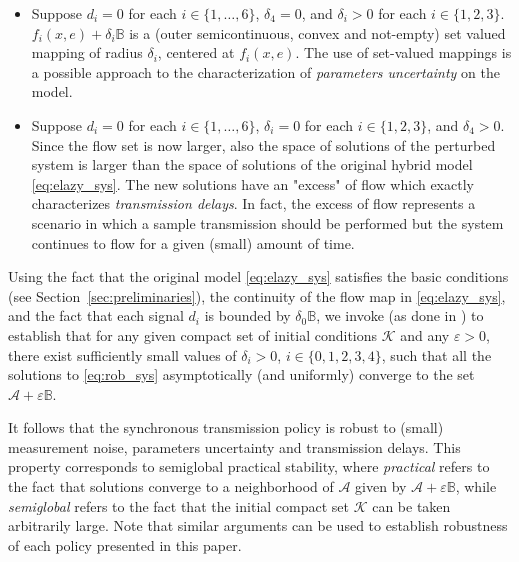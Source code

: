 \documentclass[twocolumn]{autart}
\begin{document}
{\begin{itemize}
\item Suppose $d_i=0$ for each $i\in\{1,\dots,6\}$, $\delta_4=0$,
and $\delta_i>0$ for each $i\in\{1,2,3\}$. 
$f_i(x,e) + \delta_i \mathbb{B}$ is a (outer semicontinuous, convex and not-empty)
set valued mapping of radius $\delta_i$, centered at $f_i(x,e)$. 
The use of set-valued mappings is a possible approach to the characterization
of \emph{parameters uncertainty} on the model.

\item Suppose $d_i=0$ for each $i\in\{1,\dots,6\}$, 
$\delta_i=0$ for each $i\in\{1,2,3\}$, and $\delta_4>0$.
Since the flow set is now larger, also the space of solutions
of the perturbed system is larger than the
space of solutions of the original hybrid model \eqref{eq:elazy_sys}.
The new solutions have an "excess" of flow which exactly characterizes
\emph{transmission delays}. In fact, the excess of flow represents a 
scenario in which a sample transmission should be performed but the
system continues to flow for a given (small) amount of time.
\end{itemize}

Using the fact that the original model \eqref{eq:elazy_sys} satisfies
the basic conditions (see Section~\ref{sec:preliminaries}), the continuity of the flow map in \eqref{eq:elazy_sys},
and the fact that each signal $d_i$ is bounded by $\delta_0\mathbb{B}$,
we invoke \cite[Theorem 17]{GoebelCSM09} (as done in \cite[p.57]{GoebelCSM09})
to establish that for any given compact set of initial conditions $\mathcal{K}$
and any $\varepsilon>0$,
there exist sufficiently small values of $\delta_i>0$, $i\in\{0,1,2,3,4\}$,
such that all the solutions to \eqref{eq:rob_sys}
asymptotically (and uniformly) converge to the set 
$\mathcal{A}+ \varepsilon \mathbb{B}$.

It follows that the synchronous transmission policy is robust to (small) measurement noise,
parameters uncertainty and transmission delays. 
This property corresponds to semiglobal practical stability, where
\emph{practical} refers to the fact that solutions converge to a neighborhood
of $\mathcal{A}$ given by $\mathcal{A}+ \varepsilon \mathbb{B}$, while \emph{semiglobal} refers
to the fact that the initial compact set $\mathcal{K}$ can be taken arbitrarily large.
Note that similar arguments can be used to establish robustness of each policy presented
in this paper.
}
\end{document}
